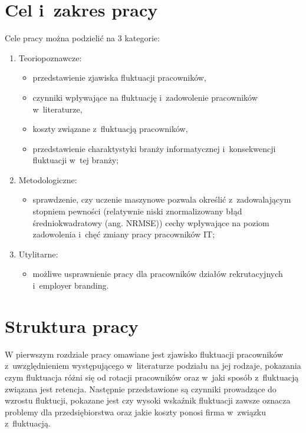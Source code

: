 \section*{Cel i~zakres pracy}\label{sec:admission:thesis-goal}

Cele pracy można podzielić na 3 kategorie:
\begin{enumerate}
    \item Teoriopoznawcze:
    \begin{itemize}
        \item przedstawienie zjawiska fluktuacji pracowników,
        \item czynniki wpływające na fluktuację i~zadowolenie pracowników w~literaturze,
        \item koszty związane z~fluktuacją pracowników,
        \item przedstawienie charaktystyki branży informatycznej i~konsekwencji fluktuacji w~tej branży;
    \end{itemize}
    \item Metodologiczne:
    \begin{itemize}
        \item sprawdzenie, czy uczenie maszynowe pozwala określić z~zadowalającym stopniem pewności (relatywnie niski znormalizowany błąd średniokwadratowy (ang. NRMSE)) cechy wpływające na poziom zadowolenia i~chęć zmiany pracy pracowników IT;
    \end{itemize}
    \item Utylitarne:
    \begin{itemize}
        \item możliwe usprawnienie pracy dla pracowników działów rekrutacyjnych i~employer branding.
    \end{itemize}
\end{enumerate}

\section*{Struktura pracy}\label{sec:admission:thesis-structure}

W pierwszym rozdziale pracy omawiane jest zjawisko fluktuacji pracowników z~uwzględnieniem występującego w~literaturze podziału na jej rodzaje,
pokazania czym fluktuacja różni się od rotacji pracowników oraz w~jaki sposób z~fluktuacją związana jest retencja.
Następnie przedstawione są czynniki prowadzące do wzrostu fluktucji, pokazane jest czy wysoki wskaźnik fluktuacji zawsze oznacza problemy dla przedsiębiorstwa
oraz jakie koszty ponosi firma w~związku z~fluktuacją.

